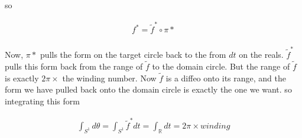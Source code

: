 \documentclass[11pt,onecolumn, a4page]{article}
\numberwithin{equation}{subsection}
\begin{document}
so 

\begin{eqnarray}
f^{*}  = \tilde{f}^{*} \circ \pi{*} \\
\end{eqnarray}

Now, $\pi{*}$ pulls the form on the target circle back to the from $dt$ on the reals. $\tilde{f}^{*}$ pulls this form back from the range of $\tilde{f}$ to the domain circle. But the range of $\tilde{f}$ is exactly $2\pi \times$ the winding number. Now $\tilde{f}$ is a diffeo onto its range, and the form we have pulled back onto the domain circle is exactly the one we want. so integrating this form 

\begin{eqnarray}
\int_{S^{1}}d\theta = \int_{S^{1}} \tilde{f}^{*}{dt} = \int_{\mathbb{R}} {dt} =  2\pi \times winding 
\end{eqnarray} 
\end{document}
